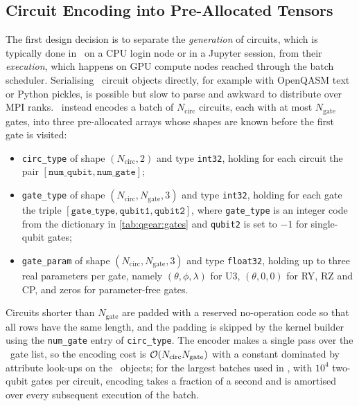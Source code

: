 \subsection{Circuit Encoding into Pre-Allocated Tensors}\label{sec:qgear:encoding}

The first design decision is to separate the \emph{generation} of circuits, which is typically done in \qiskit\ on a CPU login node or in a Jupyter session, from their \emph{execution}, which happens on GPU compute nodes reached through the batch scheduler. Serialising \qiskit\ circuit objects directly, for example with OpenQASM text or Python pickles, is possible but slow to parse and awkward to distribute over MPI ranks. \qgear\ instead encodes a batch of $N_{\mathrm{circ}}$ circuits, each with at most $N_{\mathrm{gate}}$ gates, into three pre-allocated arrays whose shapes are known before the first gate is visited:
\begin{itemize}
  \item \texttt{circ\_type} of shape $(N_{\mathrm{circ}},2)$ and type \texttt{int32}, holding for each circuit the pair $[\texttt{num\_qubit},\texttt{num\_gate}]$;
  \item \texttt{gate\_type} of shape $(N_{\mathrm{circ}},N_{\mathrm{gate}},3)$ and type \texttt{int32}, holding for each gate the triple $[\texttt{gate\_type},\texttt{qubit1},\texttt{qubit2}]$, where \texttt{gate\_type} is an integer code from the dictionary in \cref{tab:qgear:gates} and \texttt{qubit2} is set to $-1$ for single-qubit gates;
  \item \texttt{gate\_param} of shape $(N_{\mathrm{circ}},N_{\mathrm{gate}},3)$ and type \texttt{float32}, holding up to three real parameters per gate, namely $(\theta,\phi,\lambda)$ for U3, $(\theta,0,0)$ for RY, RZ and CP, and zeros for parameter-free gates.
\end{itemize}
Circuits shorter than $N_{\mathrm{gate}}$ are padded with a reserved no-operation code so that all rows have the same length, and the padding is skipped by the kernel builder using the \texttt{num\_gate} entry of \texttt{circ\_type}. The encoder makes a single pass over the \qiskit\ gate list, so the encoding cost is $\mathcal{O}\!\left(N_{\mathrm{circ}}N_{\mathrm{gate}}\right)$ with a constant dominated by attribute look-ups on the \qiskit\ objects; for the largest batches used in \cite{guo2025qgear}, with $10^{4}$ two-qubit gates per circuit, encoding takes a fraction of a second and is amortised over every subsequent execution of the batch.

